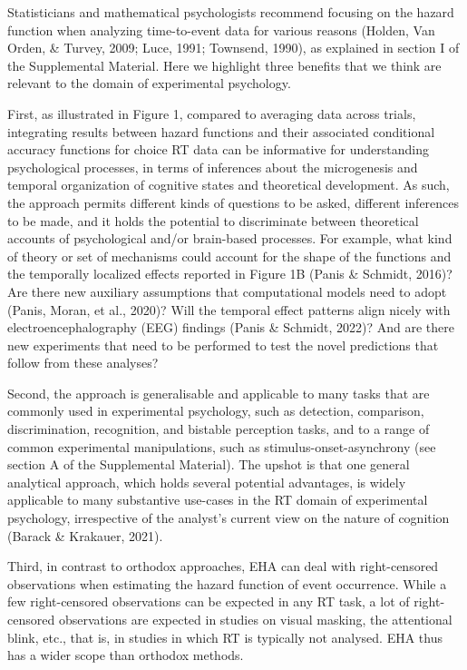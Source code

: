 \documentclass[
  english,
  man, donotrepeattitle,floatsintext]{apa6}
\begin{document}
Statisticians and mathematical psychologists recommend focusing on the hazard function when analyzing time-to-event data for various reasons (Holden, Van Orden, \& Turvey, 2009; Luce, 1991; Townsend, 1990), as explained in section I of the Supplemental Material. Here we highlight three benefits that we think are relevant to the domain of experimental psychology.

First, as illustrated in Figure 1, compared to averaging data across trials, integrating results between hazard functions and their associated conditional accuracy functions for choice RT data can be informative for understanding psychological processes, in terms of inferences about the microgenesis and temporal organization of cognitive states and theoretical development.
As such, the approach permits different kinds of questions to be asked, different inferences to be made, and it holds the potential to discriminate between theoretical accounts of psychological and/or brain-based processes.
For example, what kind of theory or set of mechanisms could account for the shape of the functions and the temporally localized effects reported in Figure 1B (Panis \& Schmidt, 2016)?
Are there new auxiliary assumptions that computational models need to adopt (Panis, Moran, et al., 2020)?
Will the temporal effect patterns align nicely with electroencephalography (EEG) findings (Panis \& Schmidt, 2022)?
And are there new experiments that need to be performed to test the novel predictions that follow from these analyses?

Second, the approach is generalisable and applicable to many tasks that are commonly used in experimental psychology, such as detection, comparison, discrimination, recognition, and bistable perception tasks, and to a range of common experimental manipulations, such as stimulus-onset-asynchrony (see section A of the Supplemental Material).
The upshot is that one general analytical approach, which holds several potential advantages, is widely applicable to many substantive use-cases in the RT domain of experimental psychology, irrespective of the analyst's current view on the nature of cognition (Barack \& Krakauer, 2021).

Third, in contrast to orthodox approaches, EHA can deal with right-censored observations when estimating the hazard function of event occurrence. While a few right-censored observations can be expected in any RT task, a lot of right-censored observations are expected in studies on visual masking, the attentional blink, etc., that is, in studies in which RT is typically not analysed. EHA thus has a wider scope than orthodox methods.
\end{document}
